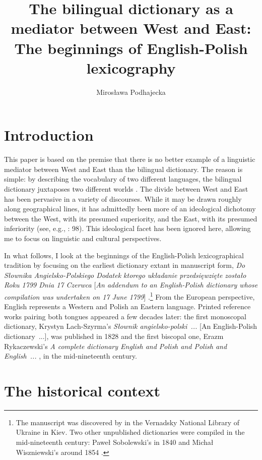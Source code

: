 \documentclass[output=paper,colorlinks,citecolor=brown,arabicfont,chinesefont]{langscibook}
\author{Mirosława Podhajecka\affiliation{University of Opole}}
\title[The beginnings of English-Polish lexicography]
      {The bilingual dictionary as a mediator between West and East: The beginnings of English-Polish lexicography}
\begin{document}
\maketitle

\section{Introduction}

This paper is based on the premise that there is no better example of a linguistic mediator between West and East than the bilingual dictionary. The reason is simple: by describing the vocabulary of two different languages, the bilingual dictionary juxtaposes two different worlds \citep[19]{Podhajecka_miroslawa2016a}. The divide between West and East has been pervasive in a variety of discourses. While it may be drawn roughly along geographical lines, it has admittedly been more of an ideological dichotomy between the West, with its presumed superiority, and the East, with its presumed inferiority (see, e.g., \citealt{SpencerWollman2002}:  98). This ideological facet has been ignored here, allowing me to focus on linguistic and cultural perspectives.

In what follows, I look at the beginnings of the English-Polish lexicographical tradition by focusing on the earliest dictionary extant in manuscript form, \emph{Do Słownika Angielsko-Polskiego Dodatek ktorego układanie przedsięwzięte zostało  Roku 1799 Dnia 17 Czerwca} [\emph{An addendum to an English-Polish dictionary whose compilation was undertaken on 17 June 1799}] \citep{[SAP]}.\footnote{The manuscript was discovered by \citet[134--136]{Siekierska_krystyna1985} in the Vernadsky National Library of Ukraine in Kiev. Two other unpublished dictionaries were compiled in the mid-nineteenth century: Paweł Sobolewski’s in 1840 \citep{Podhajecka_miroslawa2016b} and Michał Wiszniewski’s around 1854 \citep{Jajdelski2000}.}  From the European perspective, English represents a Western and Polish an Eastern language. Printed reference works pairing both tongues appeared a few decades later: the first monoscopal dictionary, Krystyn Lach-Szyrma’s \textit{{Słownik angielsko-polski~...}} [An English-Polish dictionary~...], was published in 1828 \citep{Lach-szyrma_krystyn1828} and the first biscopal one, Erazm Rykaczewski’s \emph{A complete dictionary English and Polish and Polish and English~...} \citep{Rykaczewski1849}, in the mid-nineteenth century.

\section{The historical context}
\end{document}
